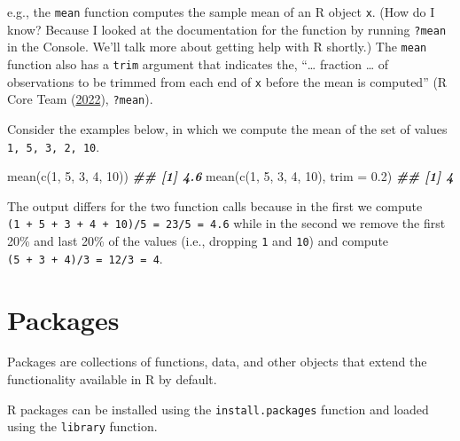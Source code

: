 \documentclass[
]{book}
\newenvironment{Shaded}{\begin{snugshade}}{\end{snugshade}}
\newcommand{\AttributeTok}[1]{\textcolor[rgb]{0.77,0.63,0.00}{#1}}
\newcommand{\DecValTok}[1]{\textcolor[rgb]{0.00,0.00,0.81}{#1}}
\newcommand{\DocumentationTok}[1]{\textcolor[rgb]{0.56,0.35,0.01}{\textbf{\textit{#1}}}}
\newcommand{\FloatTok}[1]{\textcolor[rgb]{0.00,0.00,0.81}{#1}}
\newcommand{\FunctionTok}[1]{\textcolor[rgb]{0.00,0.00,0.00}{#1}}
\newcommand{\NormalTok}[1]{#1}
\theoremstyle{definition}
\theoremstyle{definition}
\theoremstyle{definition}
\theoremstyle{definition}
\theoremstyle{remark}
\begin{document}
e.g., the \texttt{mean} function computes the sample mean of an R object \texttt{x}. (How do I know? Because I looked at the documentation for the function by running \texttt{?mean} in the Console. We'll talk more about getting help with R shortly.) The \texttt{mean} function also has a \texttt{trim} argument that indicates the, ``\ldots{} fraction \ldots{} of observations to be trimmed from each end of \texttt{x} before the mean is computed'' (R Core Team (\protect\hyperlink{ref-R-base}{2022}), \texttt{?mean}).

Consider the examples below, in which we compute the mean of the set of values \texttt{1,\ 5,\ 3,\ 2,\ 10}.

\begin{Shaded}
\begin{Highlighting}[]
\FunctionTok{mean}\NormalTok{(}\FunctionTok{c}\NormalTok{(}\DecValTok{1}\NormalTok{, }\DecValTok{5}\NormalTok{, }\DecValTok{3}\NormalTok{, }\DecValTok{4}\NormalTok{, }\DecValTok{10}\NormalTok{))}
\DocumentationTok{\#\# [1] 4.6}
\FunctionTok{mean}\NormalTok{(}\FunctionTok{c}\NormalTok{(}\DecValTok{1}\NormalTok{, }\DecValTok{5}\NormalTok{, }\DecValTok{3}\NormalTok{, }\DecValTok{4}\NormalTok{, }\DecValTok{10}\NormalTok{), }\AttributeTok{trim =} \FloatTok{0.2}\NormalTok{)}
\DocumentationTok{\#\# [1] 4}
\end{Highlighting}
\end{Shaded}

The output differs for the two function calls because in the first we compute \texttt{(1\ +\ 5\ +\ 3\ +\ 4\ +\ 10)/5\ =\ 23/5\ =\ 4.6} while in the second we remove the first 20\% and last 20\% of the values (i.e., dropping \texttt{1} and \texttt{10}) and compute \texttt{(5\ +\ 3\ +\ 4)/3\ =\ 12/3\ =\ 4}.

\hypertarget{packages}{%
\section{Packages}\label{packages}}

Packages are collections of functions, data, and other objects that extend the functionality available in R by default.

R packages can be installed using the \texttt{install.packages} function and loaded using the \texttt{library} function.
\end{document}
